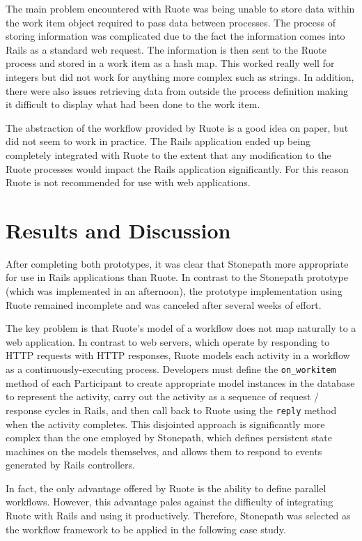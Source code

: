 \documentclass[document.tex]{subfiles}
\begin{document}
The main problem encountered with Ruote was being unable to store data within the work item object required to pass data between processes. The process of storing information was complicated due to the fact the information comes into Rails as a standard web request. The information is then sent to the Ruote process and stored in a work item as a hash map. This worked really well for integers but did not work for anything more complex such as strings. In addition, there were also issues retrieving data from outside the process definition making it difficult to display what had been done to the work item.

The abstraction of the workflow provided by Ruote is a good idea on paper, but did not seem to work in practice. The Rails application ended up being completely integrated with Ruote to the extent that any modification to the Ruote processes would impact the Rails application significantly. For this reason Ruote is not recommended for use with web applications.


\FloatBarrier

\section {Results and Discussion}


After completing both prototypes, it was clear that Stonepath more appropriate for use in Rails applications than Ruote. In contrast to the Stonepath prototype (which was implemented in an afternoon), the prototype implementation using Ruote remained incomplete and was canceled after several weeks of effort.

The key problem is that Ruote's model of a workflow does not map naturally to a web application. In contrast to web servers, which operate by responding to HTTP requests with HTTP responses, Ruote models each activity in a workflow as a continuously-executing process. Developers must define the \verb!on_workitem! method of each Participant to create appropriate model instances in the database to represent the activity, carry out the activity as a sequence of request / response cycles in Rails, and then call back to Ruote using the \verb!reply! method when the activity completes. This disjointed approach is significantly more complex than the one employed by Stonepath, which defines persistent state machines on the models themselves, and allows them to respond to events generated by Rails controllers.

In fact, the only advantage offered by Ruote is the ability to define parallel workflows. However, this advantage pales against the difficulty of integrating Ruote with Rails and using it productively. Therefore, Stonepath was selected as the workflow framework to be applied in the following case study.
\end{document}
